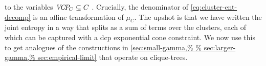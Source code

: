 \documentclass{article}
\begin{document}
to the variables $\mathit{V\mskip-5muC\mskip-3.5muP\!}_C \subseteq C$
\unskip.
%
Crucially, the denominator of \eqref{eq:cluster-ent-decomp} is an affine transformation of $\mu_C$.
The upshot is that we have written the joint entropy in a way that
splits as a sum of terms over the clusters, each of which can be captured 
with
a dcp exponential cone constraint.
We now use this to get analogues of the constructions
in \cref{sec:small-gamma,%
sec:empirical-limit} that 
operate
on clique-trees.
\end{document}
